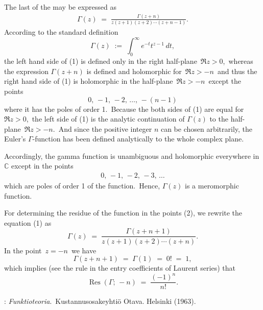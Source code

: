 \documentclass[12pt]{article}
\DeclareMathOperator{\Res}{Res}
\theoremstyle{definition}
\begin{document}
 

The last  of the  may be expressed as
\begin{align}
 \Gamma(z) \;=\; \frac{\Gamma(z\!+\!n)}{z(z\!+\!1)(z\!+\!2)\cdots(z\!+\!n\!-\!1)}.
\end{align}
According to the standard definition
$$\Gamma(z) \;:=\; \int_0^\infty\!e^{-t}t^{z-1}\,dt,$$
the left hand side of (1) is defined only in the right half-plane\, $\Re{z} > 0$,\, 
whereas the expression $\Gamma(z+n)$ is defined and holomorphic for\, $\Re{z} > -n$\, 
and thus the right hand side of (1) is holomorphic in the half-plane\, $\Re{z} > -n$\, 
except the points
$$0,\,-1,\,-2,\,\ldots,\,-(n\!-\!1)$$
where it has the poles of order 1.\, Because the both sides of (1) are equal for\,  
$\Re{z} > 0$,\, the left side of (1) is the analytic continuation of $\Gamma(z)$ to 
the half-plane\, $\Re{z} > -n$.\, And since the positive integer $n$ can be chosen 
arbitrarily, the Euler's $\Gamma$-function has been defined analytically to the whole 
complex plane.

Accordingly, the gamma function is unambiguous and holomorphic everywhere in $\mathbb{C}$ 
except in the points
\begin{align}
0,\,-1,\,-2,\,-3,\,\ldots
\end{align}
which are poles of order 1 of the function.\, Hence, $\Gamma(z)$ 
is a meromorphic function.

For determining the residue of the function in the points (2), we rewrite the equation (1) as
$$\Gamma(z) \;=\; 
\frac{\Gamma(z\!+\!n\!+\!1)}{z(z\!+\!1)(z\!+\!2)\cdots(z\!+\!n)}.$$
In the point\, $z = -n$\, we have
$$\Gamma(z\!+\!n\!+\!1) \;=\; \Gamma(1) \;=\; 0! \;=\; 1,$$
which implies (see the rule in the entry coefficients of Laurent series) that
$$\Res(\Gamma;\,-n) \;=\; \frac{(-1)^n}{n!}.$$

\begin{thebibliography}{9}
: {\em Funktioteoria}.\, Kustannusosakeyhti\"o Otava. Helsinki (1963).
\end{thebibliography}

\end{document}
